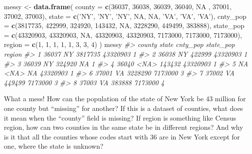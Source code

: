 \documentclass[]{book}
\newenvironment{Shaded}{\begin{snugshade}}{\end{snugshade}}
\newcommand{\KeywordTok}[1]{\textcolor[rgb]{0.13,0.29,0.53}{\textbf{#1}}}
\newcommand{\DataTypeTok}[1]{\textcolor[rgb]{0.13,0.29,0.53}{#1}}
\newcommand{\DecValTok}[1]{\textcolor[rgb]{0.00,0.00,0.81}{#1}}
\newcommand{\StringTok}[1]{\textcolor[rgb]{0.31,0.60,0.02}{#1}}
\newcommand{\CommentTok}[1]{\textcolor[rgb]{0.56,0.35,0.01}{\textit{#1}}}
\newcommand{\OtherTok}[1]{\textcolor[rgb]{0.56,0.35,0.01}{#1}}
\newcommand{\NormalTok}[1]{#1}
\begin{document}
\begin{Shaded}
\begin{Highlighting}[]
\NormalTok{messy <-}\StringTok{ }\KeywordTok{data.frame}\NormalTok{(}
  \DataTypeTok{county =} \KeywordTok{c}\NormalTok{(}\DecValTok{36037}\NormalTok{, }\DecValTok{36038}\NormalTok{, }\DecValTok{36039}\NormalTok{, }\DecValTok{36040}\NormalTok{, }\OtherTok{NA}\NormalTok{ , }\DecValTok{37001}\NormalTok{, }\DecValTok{37002}\NormalTok{, }\DecValTok{37003}\NormalTok{),}
  \DataTypeTok{state =} \KeywordTok{c}\NormalTok{(}\StringTok{'NY'}\NormalTok{, }\StringTok{'NY'}\NormalTok{, }\StringTok{'NY'}\NormalTok{, }\OtherTok{NA}\NormalTok{, }\OtherTok{NA}\NormalTok{, }\StringTok{'VA'}\NormalTok{, }\StringTok{'VA'}\NormalTok{, }\StringTok{'VA'}\NormalTok{),}
  \DataTypeTok{cnty_pop =} \KeywordTok{c}\NormalTok{(}\DecValTok{3817735}\NormalTok{, }\DecValTok{422999}\NormalTok{, }\DecValTok{324920}\NormalTok{, }\DecValTok{143432}\NormalTok{, }\OtherTok{NA}\NormalTok{, }\DecValTok{3228290}\NormalTok{, }\DecValTok{449499}\NormalTok{, }\DecValTok{383888}\NormalTok{),}
  \DataTypeTok{state_pop =} \KeywordTok{c}\NormalTok{(}\DecValTok{43320903}\NormalTok{, }\DecValTok{43320903}\NormalTok{, }\OtherTok{NA}\NormalTok{, }\DecValTok{43320903}\NormalTok{, }\DecValTok{43320903}\NormalTok{, }\DecValTok{7173000}\NormalTok{, }\DecValTok{7173000}\NormalTok{, }\DecValTok{7173000}\NormalTok{),}
  \DataTypeTok{region =} \KeywordTok{c}\NormalTok{(}\DecValTok{1}\NormalTok{, }\DecValTok{1}\NormalTok{, }\DecValTok{1}\NormalTok{, }\DecValTok{1}\NormalTok{, }\DecValTok{1}\NormalTok{, }\DecValTok{3}\NormalTok{, }\DecValTok{3}\NormalTok{, }\DecValTok{4}\NormalTok{)}
\NormalTok{)}
\NormalTok{messy}
\CommentTok{#>   county state cnty_pop state_pop region}
\CommentTok{#> 1  36037    NY  3817735  43320903      1}
\CommentTok{#> 2  36038    NY   422999  43320903      1}
\CommentTok{#> 3  36039    NY   324920        NA      1}
\CommentTok{#> 4  36040  <NA>   143432  43320903      1}
\CommentTok{#> 5     NA  <NA>       NA  43320903      1}
\CommentTok{#> 6  37001    VA  3228290   7173000      3}
\CommentTok{#> 7  37002    VA   449499   7173000      3}
\CommentTok{#> 8  37003    VA   383888   7173000      4}
\end{Highlighting}
\end{Shaded}

What a mess! How can the population of the state of New York be 43
million for one county but ``missing'' for another? If this is a dataset
of counties, what does it mean when the ``county'' field is missing? If
region is something like Census region, how can two counties in the same
state be in different regions? And why is it that all the counties whose
codes start with 36 are in New York except for one, where the state is
unknown?
\end{document}
